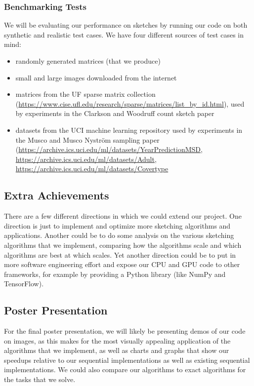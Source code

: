 \documentclass[12pt]{article}
\begin{document}
\subsubsection{Benchmarking Tests}
We will be evaluating our performance on sketches by running our code on both synthetic and realistic test cases. We have four different sources of test cases in mind:
\begin{itemize}
	\item randomly generated matrices (that we produce)
	\item small and large images downloaded from the internet
	\item matrices from the UF sparse matrix collection (\url{https://www.cise.ufl.edu/research/sparse/matrices/list_by_id.html}), used by experiments in the Clarkson and Woodruff count sketch paper \cite{clarkson2013low}
	\item datasets from the UCI machine learning repository used by experiments in the Musco and Musco Nystr\"om sampling paper \cite{musco2017recursive} (\url{https://archive.ics.uci.edu/ml/datasets/YearPredictionMSD}, \url{https://archive.ics.uci.edu/ml/datasets/Adult}, \url{https://archive.ics.uci.edu/ml/datasets/Covertype}
\end{itemize}

\subsection{Extra Achievements}
There are a few different directions in which we could extend our project. One direction is just to implement and optimize more sketching algorithms and applications. Another could be to do some analysis on the various sketching algorithms that we implement, comparing how the algorithms scale and which algorithms are best at which scales. Yet another direction could be to put in more software engineering effort and expose our CPU and GPU code to other frameworks, for example by providing a Python library (like NumPy and TensorFlow). 

\subsection{Poster Presentation}
For the final poster presentation, we will likely be presenting demos of our code on images, as this makes for the most visually appealing application of the algorithms that we implement, as well as charts and graphs that show our speedups relative to our sequential implementations as well as existing sequential implementations. We could also compare our algorithms to exact algorithms for the tasks that we solve. 
\end{document}

